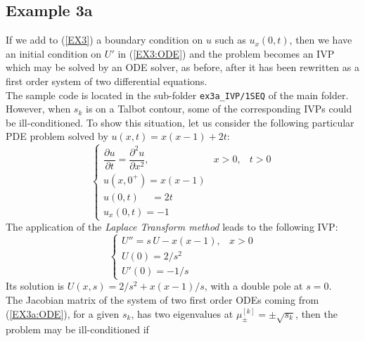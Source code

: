 \documentclass[a4paper,10pt]{report}%
\begin{document}
\subsection{Example 3a} \label{SEQ:3a}
If we add to (\ref{EX3}) a boundary condition on $u$ such as $u_x(0,t)$, then we have an initial
condition on $U'$ in (\ref{EX3:ODE}) and the problem becomes an IVP which
may be solved by an ODE solver, as before, after it has been rewritten as a first order system of two
differential equations.
\\
The sample code is located in the sub-folder {\tt ex3a\_IVP/1SEQ} of the main folder.
\\
However, when $s_k$ is on a Talbot contour, some of the corresponding IVPs could be ill-conditioned.
To show this situation, let us consider the following particular PDE problem solved by $u(x,t)=x(x-1)+2t$:
\begin{equation}\label{EX3a:PDE}
\left\{\begin{array}{lll}
\dfrac{\partial u}{\partial t} = \dfrac{\partial^2 u}{\partial x^2}, & x>0, & t>0 \\[8pt]
u(x,0^+)          = x(x-1) \\
u(0,t)\phantom{+} = 2t     \\
u_x(0,t) = -1
\end{array}\right.
\end{equation}
The application of the {\em Laplace Transform method} leads to the following IVP:
\begin{equation}\label{EX3a:ODE}
\left\{\begin{array}{ll}
U''     = s\,U - x(x-1), & x>0 \\
U(0)  = 2/s^2                \\
U'(0) = -1/s
\end{array}\right.
\end{equation}
Its solution is $U(x,s)=2/s^2 + x(x-1)/s$, with a double pole at $s=0$.
\\
The Jacobian matrix of the system of two first order ODEs coming from (\ref{EX3a:ODE}), for a given $s_k$,
has two eigenvalues at $\mu^{[k]}_\pm=\pm\sqrt{s_k}$, then the problem may be ill-conditioned if
\end{document}
